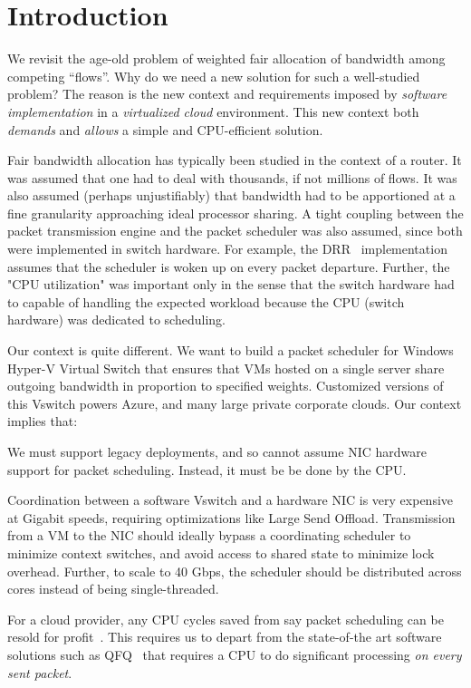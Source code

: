 \section {Introduction}

We revisit the age-old problem of weighted fair allocation of bandwidth among
competing ``flows''. Why do we need a new solution for such a well-studied
problem? The reason is the new context and requirements imposed by {\em
software implementation} in a {\em virtualized cloud} environment. This new
context both {\em demands} and {\em allows} a simple and CPU-efficient solution. 

Fair bandwidth allocation has typically been studied in the context of a router.
It was assumed that one had to deal with thousands, if not millions of flows. It
was also assumed (perhaps unjustifiably) that bandwidth had to be apportioned at
a fine granularity approaching ideal processor sharing. A tight coupling between
the packet transmission engine and the packet scheduler was also assumed, since
both were implemented in switch hardware.  For example, the DRR~\cite{drr}
implementation assumes that the scheduler is woken up on every packet departure.
Further, the "CPU utilization" was important only in the sense that the switch
hardware had to capable of handling the expected workload because the CPU
(switch hardware) was dedicated to scheduling.

Our context is quite different. We want to build a packet scheduler for Windows
Hyper-V Virtual Switch that ensures that VMs hosted on a single server share
outgoing bandwidth in proportion to specified weights. Customized versions of
this Vswitch powers Azure, and many large private corporate clouds. Our context
implies that:

 We must support legacy
deployments, and so cannot assume NIC hardware support for packet scheduling.
Instead, it must be be done by the CPU.

 Coordination between a software
Vswitch and a hardware NIC is very expensive at Gigabit speeds, requiring
optimizations like Large Send Offload.  Transmission from a VM to the NIC should
ideally bypass a coordinating scheduler to minimize context switches, and avoid
access to shared state to minimize lock overhead.  Further, to scale to 40 Gbps,
the scheduler should be distributed across cores instead of being
single-threaded. 

 For a cloud provider, any CPU cycles
saved from say packet scheduling can be resold for profit~\cite{aws}.  This
requires us to depart from the state-of-the art software solutions such as
QFQ~\cite{qfq} that requires a CPU to do significant processing {\em on every
sent packet}.

